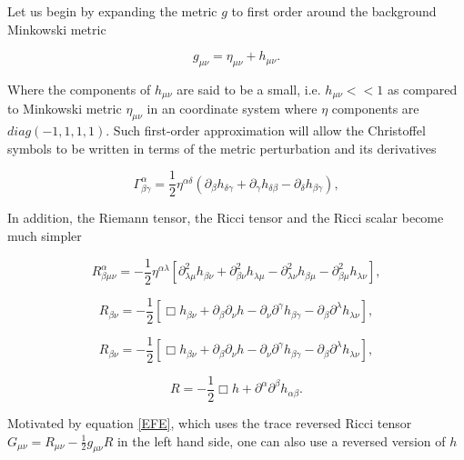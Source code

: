 Let us begin by expanding the metric $g$ to first order around the background Minkowski metric 

\begin{equation}\label{metric}
g_{\mu \nu} =  \eta_{\mu \nu} + h_{\mu \nu}.
\end{equation}

Where the components of $h_{\mu \nu}$ are said to be a small, i.e. $h_{\mu \nu}<<1$ as compared to Minkowski metric $\eta_{\mu \nu}$  in an coordinate system where $\eta$ components are $diag(-1,1,1,1)$. Such first-order approximation will allow the Christoffel symbols to be written in terms of the metric perturbation and its derivatives

\begin{equation}\label{cris}
\Gamma^{\alpha}_{\beta \gamma} = \frac{1}{2} \eta^{\alpha \delta}(\partial_{\beta} h_{\delta \gamma} + \partial_{\gamma} h_{\delta \beta} - \partial_{\delta} h_{\beta \gamma}),
\end{equation}

In addition, the Riemann tensor, the Ricci tensor and the Ricci scalar become much simpler

\begin{equation}
R^{\alpha}_{\beta \mu\nu} = -\frac{1}{2} \eta^{\alpha \lambda} [ \partial^2_{\lambda \mu} h_{\beta \nu} + \partial^2_{\beta \nu} h_{\lambda \mu} - \partial^2_{\lambda \nu} h_{\beta \mu} - \partial^2_{\beta \mu} h_{\lambda \nu}],
\end{equation}

\begin{equation}
R_{\beta \nu} = -\frac{1}{2} [ \Box h_{\beta \nu} + \partial_{\beta}\partial_{\nu} h - \partial_{\nu} \partial^{\gamma} h_{\beta \gamma} - \partial_{\beta} \partial^{\lambda} h_{\lambda \nu} ],
\end{equation}

\begin{equation}\label{mcieuf}
R_{\beta \nu} = -\frac{1}{2} [ \Box h_{\beta \nu} + \partial_{\beta}\partial_{\nu} h - \partial_{\nu} \partial^{\gamma} h_{\beta \gamma} - \partial_{\beta} \partial^{\lambda} h_{\lambda \nu} ],
\end{equation}


\begin{equation}\label{cxndown}
R = -\frac{1}{2} \Box h + \partial^{\alpha}\partial^{\beta} h_{\alpha \beta}.
\end{equation}

Motivated by equation \ref{EFE},  which uses the trace reversed Ricci tensor $G_{\mu \nu}= R_{\mu\nu}-\frac{1}{2} g_{\mu\nu} R$ in the left hand side, one can also use a reversed version of $h$



